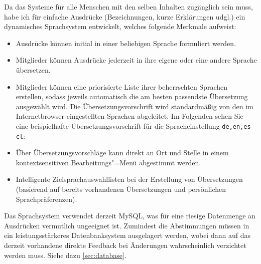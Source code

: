 Da das Systeme für alle Menschen mit den selben Inhalten zugänglich sein muss, habe ich für einfache Ausdrücke (Bezeichnungen, kurze Erklärungen udgl.) ein dynamisches Sprachsystem entwickelt, welches folgende Merkmale aufweist:
\begin{itemize}
\item Ausdrücke können initial in einer beliebigen Sprache formuliert werden.
\item Mitglieder können Ausdrücke jederzeit in ihre eigene oder eine andere Sprache übersetzen.
\item Mitglieder können eine priorisierte Liste ihrer beherrschten Sprachen erstellen, sodass jeweils automatisch die am besten passendste Übersetzung ausgewählt wird. Die Übersetzungsvorschrift wird standardmäßig von den im Internetbrowser eingestellten Sprachen abgeleitet. Im Folgenden sehen Sie eine beispielhafte Übersetzungsvorschrift für die Spracheinstellung \verb|de,en,es-cl|:
\item Über Übersetzungsvorschläge kann direkt an Ort und Stelle in einem kontextsensitiven Bearbeitungs"=Menü abgestimmt werden.
\item Intelligente Zielsprachauswahllisten bei der Erstellung von Übersetzungen (basierend auf bereits vorhandenen Übersetzungen und persönlichen Sprachpräferenzen).
\end{itemize}

Das Sprachsystem verwendet derzeit MySQL, was für eine riesige Datenmenge an Ausdrücken vermutlich ungeeignet ist. Zumindest die Abstimmungen müssen in ein leistungsstärkeres Datenbanksystem ausgelagert werden, wobei dann auf das derzeit vorhandene direkte Feedback bei Änderungen wahrscheinlich verzichtet werden muss. Siehe dazu \vref{sec:database}.

